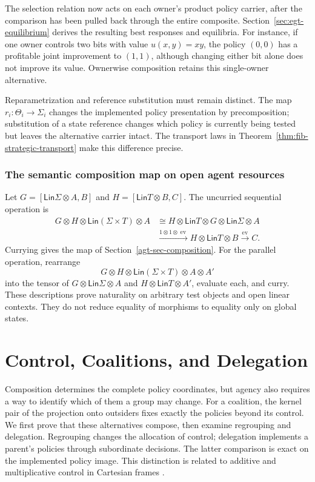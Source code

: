 \documentclass[11pt,a4paper]{article}
\numberwithin{equation}{section}
\theoremstyle{definition}
\theoremstyle{remark}
\theoremstyle{plain}
\providecommand{\Lin}{\mathsf{Lin}}
\providecommand{\ev}{\mathop{\mathrm{ev}}}
\begin{document}
The selection relation now acts on each owner's product policy
carrier, after the comparison has been pulled back through the entire
composite. Section~\ref{sec:egt-equilibrium} derives the resulting best
responses and equilibria. For instance, if one owner controls two bits
with value $u(x,y)=xy$, the policy $(0,0)$ has a profitable joint improvement to $(1,1)$,
although changing either bit alone does not improve its value.
Ownerwise composition retains this single-owner alternative.

Reparametrization and reference substitution must remain distinct.
The map $r_i:\Theta_i\to\Sigma_i$ changes the implemented policy
presentation by precomposition; substitution of a state reference changes
which policy is currently being tested but leaves the alternative carrier
intact. The transport laws in Theorem~\ref{thm:fib-strategic-transport}
make this difference precise.

\subsubsection{The semantic composition map on open agent resources}
\label{agt-app-coherence}

Let $G=[\Lin\Sigma\otimes A,B]$ and
$H=[\Lin T\otimes B,C]$. The uncurried sequential operation is
\begin{align*}
 G\otimes H\otimes\Lin(\Sigma\times T)\otimes A
 &\cong H\otimes\Lin T\otimes G\otimes\Lin\Sigma\otimes A\\
 &\xrightarrow{1\otimes1\otimes\ev}
       H\otimes\Lin T\otimes B
 \xrightarrow{\ev} C.
\end{align*}
Currying gives the map of Section~\ref{agt-sec-composition}.
For the parallel operation, rearrange
\[
 G\otimes H\otimes\Lin(\Sigma\times T)\otimes A\otimes A'
\]
into the tensor of $G\otimes\Lin\Sigma\otimes A$ and
$H\otimes\Lin T\otimes A'$, evaluate each, and curry. These descriptions
prove naturality on arbitrary test objects and open linear contexts.
They do not reduce equality of morphisms to equality only on global states.

\section{Control, Coalitions, and Delegation}\label{sec:paper-4}

Composition determines the complete policy coordinates, but agency
also requires a way to identify which of them a group may change.
For a coalition, the kernel pair of the projection onto outsiders fixes
exactly the policies beyond its control. We first prove that these
alternatives compose, then examine regrouping and delegation. Regrouping
changes the allocation of control; delegation implements a parent's
policies through subordinate decisions. The latter comparison is exact on
the implemented policy image. This distinction is related to additive and
multiplicative control in Cartesian frames
\citep{GarrabrantEtAl2021CartesianFrames}.
\end{document}
